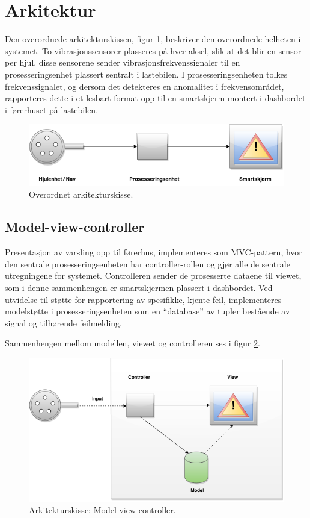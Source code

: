 \section{Arkitektur}
Den overordnede arkitekturskissen, figur \ref{fig:overordnet-ark}, 
beskriver den overordnede helheten i systemet. To vibrasjonssensorer plasseres
på hver aksel, slik at det blir en sensor per hjul. disse sensorene sender 
vibrasjonsfrekvenssignaler til en prosesseringsenhet plassert sentralt i lastebilen. 
I prosesseringsenheten tolkes frekvenssignalet, og dersom det detekteres en 
anomalitet i frekvensområdet, rapporteres dette i et lesbart format opp til en 
smartskjerm montert i dashbordet i førerhuset på lastebilen.
\newline
\begin{figure}[H]
	\centering
	\includegraphics[width=1.00\textwidth]{images/arkitektur-overordnet.png}
	\caption{Overordnet arkitekturskisse.}
	\label{fig:overordnet-ark}
\end{figure}

\subsection{Model-view-controller}
\label{sec:arkitektur}
Presentasjon av varsling opp til førerhus, implementeres som MVC-pattern, 
hvor den sentrale prosesseringsenheten har controller-rollen og gjør alle 
de sentrale utregningene for systemet. Controlleren sender de prosesserte 
dataene til viewet, som i denne sammenhengen er smartskjermen plassert i 
dashbordet. Ved utvidelse til støtte for rapportering av spesifikke, 
kjente feil, implementeres modelstøtte i prosesseringsenheten som en 
``database'' av tupler bestående av signal og tilhørende feilmelding. 

Sammenhengen mellom modellen, viewet og controlleren ses i figur \ref{fig:mvc}.
\newline
\begin{figure}[H]
	\centering
	\includegraphics[width=1.00\textwidth]{images/architecture2-mvc.png}
	\caption{Arkitekturskisse: Model-view-controller.}
	\label{fig:mvc}
\end{figure}